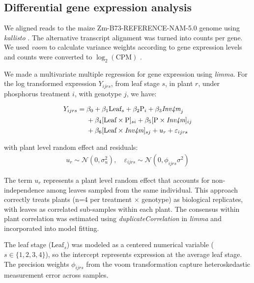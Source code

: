 \documentclass[9pt,twocolumn,twoside]{rilabRxiv}
\newcommand{\invfour}{\textit{Inv4m}\xspace}
\begin{document}
\subsection{Differential gene expression analysis}

We aligned reads to the maize Zm-B73-REFERENCE-NAM-5.0 genome using \textit{kallisto} \cite{bray2016}.
The alternative transcript alignment was turned into counts per gene.
We used \textit{voom} to calculate variance weights according to gene expression levels and counts were converted to $\log_2(\text{CPM})$ \cite{ritchie2015}.

We made a multivariate multiple regression for gene expression using \textit{limma}.
For the log transformed expression $Y_{ijrs}$, from leaf stage $s$, in plant $r$, under phosphorus treatment $i$, with genotype $j$, we have:

\begin{eqnarray}
\begin{aligned}
Y_{ijrs} = {}& \beta_0 + \beta_1 \text{Leaf}_s + \beta_2 \text{P}_i +
\beta_3 \textit{\invfour}_j \\
& + \beta_4 [\text{Leaf} \times \text{P}]_{si} +
\beta_5 [\text{P} \times \textit{\invfour}]_{ij} \\
& + \beta_6 [\text{Leaf} \times \textit{\invfour}]_{sj} +
u_r + \varepsilon_{ijrs}
\end{aligned}
\end{eqnarray}

with plant level random effect and residuals:
\begin{eqnarray}
u_r \sim \mathcal{N}(0, \sigma^2_u), \quad
\varepsilon_{ijrs} \sim \mathcal{N}(0, \phi_{ijrs}\sigma^2)
\end{eqnarray}

The term $u_r$ represents a plant level random effect that accounts for non-independence among leaves sampled from the same individual.
This approach correctly treats plants (n=4 per treatment $\times$ genotype) as biological replicates, with leaves as correlated sub-samples within each plant.
The consensus within plant correlation was estimated using \textit{duplicateCorrelation} in \textit{limma} and incorporated into model fitting.

The leaf stage ($\text{Leaf}_s$) was modeled as a centered numerical variable ($s \in \{1,2,3,4\}$), so the intercept represents expression at the average leaf stage.
The precision weights $\phi_{ijrs}$ from the voom transformation capture heteroskedastic measurement error across samples.
\end{document}
